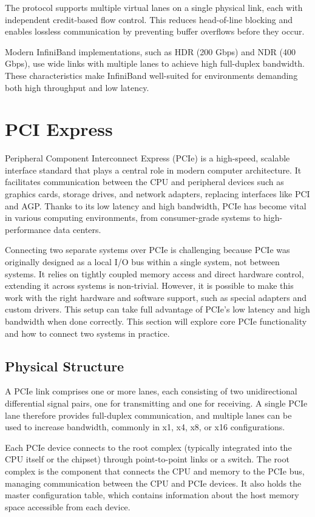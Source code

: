The protocol supports multiple virtual lanes on a single physical link, each with independent credit-based flow control. This reduces head-of-line blocking and enables lossless communication by preventing buffer overflows before they occur.

Modern InfiniBand implementations, such as HDR (200 Gbps) and NDR (400 Gbps), use wide links with multiple lanes to achieve high full-duplex bandwidth. These characteristics make InfiniBand well-suited for environments demanding both high throughput and low latency.

\section{PCI Express}

Peripheral Component Interconnect Express (PCIe) is a high-speed, scalable interface standard that plays a central role in modern computer architecture. It facilitates communication between the CPU and peripheral devices such as graphics cards, storage drives, and network adapters, replacing interfaces like PCI and AGP. Thanks to its low latency and high bandwidth, PCIe has become vital in various computing environments, from consumer-grade systems to high-performance data centers.

Connecting two separate systems over PCIe is challenging because PCIe was originally designed as a local I/O bus within a single system, not between systems. It relies on tightly coupled memory access and direct hardware control, extending it across systems is non-trivial. However, it is possible to make this work with the right hardware and software support, such as special adapters and custom drivers. This setup can take full advantage of PCIe’s low latency and high bandwidth when done correctly. This section will explore core PCIe functionality and how to connect two systems in practice.

\subsection{Physical Structure}

A PCIe link comprises one or more lanes, each consisting of two unidirectional differential signal pairs, one for transmitting and one for receiving. A single PCIe lane therefore provides full-duplex communication, and multiple lanes can be used to increase bandwidth, commonly in x1, x4, x8, or x16 configurations.

Each PCIe device connects to the root complex (typically integrated into the CPU itself or the chipset) through point-to-point links or a switch. The root complex is the component that connects the CPU and memory to the PCIe bus, managing communication between the CPU and PCIe devices. It also holds the master configuration table, which contains information about the host memory space accessible from each device.

